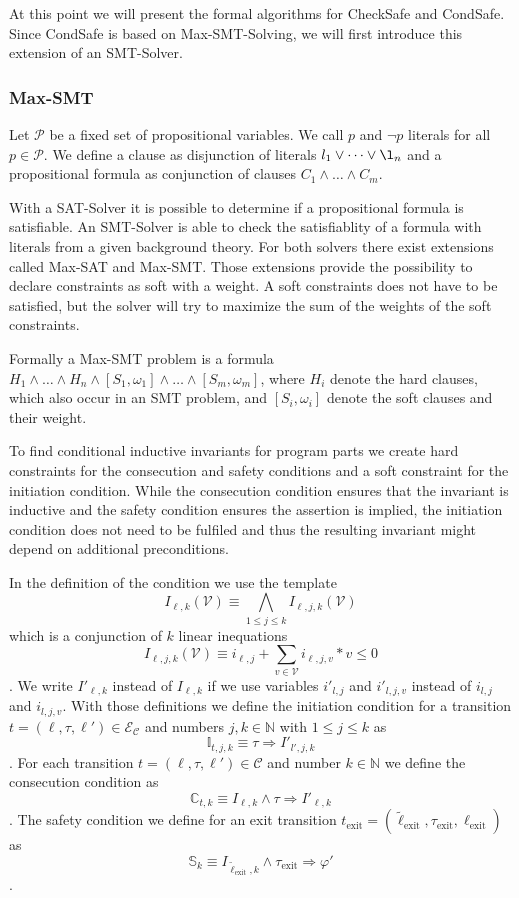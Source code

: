 \documentclass[12pt]{scrartcl}
\begin{document}
At this point we will present the formal algorithms for CheckSafe and CondSafe.
Since CondSafe is based on Max-SMT-Solving, we will first introduce this extension of an SMT-Solver.

\subsubsection{Max-SMT}

Let $\mathcal{P}$ be a fixed set of propositional variables.
We call $p$ and $\neg p$ literals for all $p \in \mathcal{P}$.
We define a clause as disjunction of literals $l_1 \vee \dots \vee \l_n$ and a propositional formula as conjunction of clauses $C_1 \wedge \dots \wedge C_m$.

With a SAT-Solver it is possible to determine if a propositional formula is satisfiable.
An SMT-Solver is able to check the satisfiablity of a formula with literals from a given background theory.
For both solvers there exist extensions called Max-SAT and Max-SMT.
Those extensions provide the possibility to declare constraints as soft with a weight.
A soft constraints does not have to be satisfied, but the solver will try to maximize the sum of the weights of the soft constraints.

Formally a Max-SMT problem is a formula $H_1 \wedge \dots \wedge H_n \wedge [S_1,\omega_1] \wedge \dots \wedge [S_m,\omega_m]$, where $H_i$ denote the hard clauses, which also occur in an SMT problem, and $[S_i,\omega_i]$ denote the soft clauses and their weight.

To find conditional inductive invariants for program parts we create hard constraints for the consecution and safety conditions and a soft constraint for the initiation condition.
While the consecution condition ensures that the invariant is inductive and the safety condition ensures the assertion is implied, the initiation condition does not need to be fulfiled and thus the resulting invariant might depend on additional preconditions.  

In the definition of the condition we use the template \[ I_{\ell,k}(\mathcal{V}) \equiv \bigwedge_{1 \leq j \leq k}{I_{\ell,j,k}(\mathcal{V})} \] which is a conjunction of $k$ linear inequations \[ I_{\ell,j,k}(\mathcal{V}) \equiv i_{\ell,j} + \sum_{v \in \mathcal{V}}{i_{\ell,j,v} * v} \leq 0 \]. We write $I'_{\ell,k}$ instead of $I_{\ell,k}$ if we use variables $i'_{l,j}$ and $i'_{l,j,v}$ instead of $i_{l,j}$ and $i_{l,j,v}$.
With those definitions we define the initiation condition for a transition $t = (\ell, \tau, \ell') \in \mathcal{E}_\mathcal{C}$ and numbers $j, k \in \mathbb{N}$ with $1 \leq j \leq k$ as \[ \mathbb{I}_{t,j,k} \equiv \tau \Rightarrow I'_{l',j,k} \]. For each transition $t = (\ell, \tau, \ell') \in \mathcal{C}$ and number $k \in \mathbb{N}$ we define the consecution condition as \[ \mathbb{C}_{t,k} \equiv I_{\ell,k} \wedge \tau \Rightarrow I'_{\ell,k} \]. The safety condition we define for an exit transition $t_\text{exit} = (\tilde{\ell}_\text{exit}, \tau_\text{exit}, \ell_\text{exit})$ as \[ \mathbb{S}_k \equiv I_{\tilde{\ell}_\text{exit},k} \wedge \tau_\text{exit} \Rightarrow \varphi' \].
\end{document}

